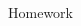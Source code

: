 \documentclass[12pt, a4paper, addpoints]{exam}
\newcommand{\ts}{\vspace{16mm}}
\begin{document}
\begin{questions}










\question  Homework
\begin{multicols}{5}
\begin{parts}


\end{parts}
\end{multicols}
\end{questions}
\end{document}
